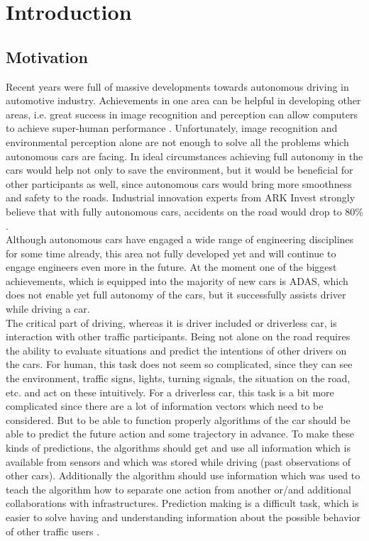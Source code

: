 
\chapter{Introduction}
\label{chap:0}

\section{Motivation}

Recent years were full of massive developments towards autonomous driving in automotive industry. Achievements in one area can be helpful in developing other areas, i.e. great success in image recognition and perception can allow computers to achieve super-human performance \cite{SuperComputer}. Unfortunately, image recognition and environmental perception alone are not enough to solve all the problems which autonomous cars are facing. In ideal circumstances achieving full autonomy in the cars would help not only to save the environment, but it would be beneficial for other participants as well, since autonomous cars would bring more smoothness and safety to the roads. Industrial innovation experts from ARK Invest strongly believe that with fully autonomous cars, accidents on the road would drop to $80$\% \cite{ARKInvest}.\\
Although autonomous cars have engaged a wide range of engineering disciplines for some time already, this area not fully developed yet and will continue to engage engineers even more in the future. At the moment one of the biggest achievements, which is equipped into the majority of new cars is \gls{ADAS}, which does not enable yet full autonomy of the cars, but it successfully assists driver while driving a car.\\
The critical part of driving, whereas it is driver included or driverless car, is interaction with other traffic participants. Being not alone on the road requires the ability to evaluate situations and predict the intentions of other drivers on the cars. For human, this task does not seem so complicated, since they can see the environment, traffic signs, lights, turning signals, the situation on the road, etc. and act on these intuitively. For a driverless car, this task is a bit more complicated since there are a lot of information vectors which need to be considered. But to be able to function properly algorithms of the car should be able to predict the future action and some trajectory in advance. To make these kinds of predictions, the algorithms should get and use all information which is available from sensors and which was stored while driving (past observations of other cars). Additionally the algorithm should use information which was used to teach the algorithm how to separate one action from another or/and additional collaborations with infrastructures. Prediction making is a difficult task, which is easier to solve having and understanding information about the possible behavior of other traffic users \cite{IntroI}. \\
